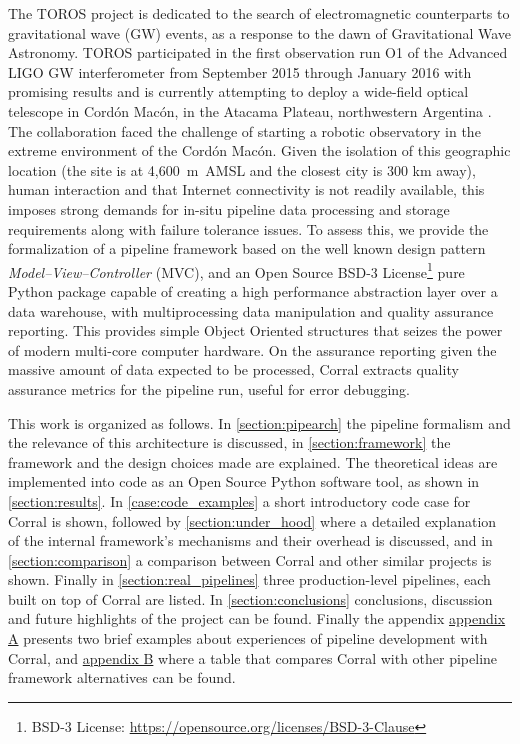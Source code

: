 \documentclass[final,5p,times,twocolumn,authoryear]{elsarticle}
\begin{document}
The TOROS project is
dedicated to the search of electromagnetic counterparts to gravitational wave (GW) events, as a response
to the dawn of Gravitational Wave Astronomy.
%
TOROS participated in the first observation run O1 of the Advanced LIGO GW interferometer \citep{ligo_seminal, O1discoveries}
from September 2015 through January 2016 with promising results \citep{resultsToros_beroiz_2016} and is currently attempting to deploy a wide-field optical telescope in Cord\'on Mac\'on, in the
Atacama Plateau, northwestern Argentina \citep{renzi2009caracterizacion, tremblin2012worldwide}.
%
The collaboration faced the challenge of starting a robotic observatory in
the extreme environment of the Cord\'on Mac\'on.
%
Given the isolation of this geographic location
(the site is at 4,600~m~AMSL and the closest city is 300 km away), human interaction
and that Internet connectivity is not readily available,
this imposes strong demands for in-situ pipeline data processing and storage requirements
along with failure tolerance issues.
%
To assess this, we provide the formalization of a pipeline framework based on the
well known design pattern \textit{Model--View--Controller} (MVC), and
an Open Source BSD-3 License\footnote{BSD-3 License: \url{https://opensource.org/licenses/BSD-3-Clause}}
pure Python package capable of creating a high performance abstraction layer
over a data warehouse, with multiprocessing data manipulation and quality assurance reporting.
%
This provides simple Object Oriented structures that seizes the power of modern multi-core
computer hardware.
%
On the assurance reporting given the massive amount of data expected to be processed,
Corral extracts quality assurance metrics for the pipeline run, useful for error debugging.

This work is organized as follows.
%
In \autoref{section:pipearch} the pipeline formalism and the
relevance of this architecture is discussed, in
\autoref{section:framework} the framework and the design choices
made are explained.
%
The theoretical ideas are implemented into code as an Open Source Python software tool, as shown in
\autoref{section:results}.
%
In \autoref{case:code_examples} a short introductory code case for Corral is shown,
%
followed by \autoref{section:under_hood} where a detailed explanation of the internal
framework's mechanisms and their overhead is discussed, and in \autoref{section:comparison}
a comparison between Corral and other similar projects is shown. Finally in
%
\autoref{section:real_pipelines} three  production-level pipelines,
each built on top of Corral are listed.
%
In \autoref{section:conclusions} conclusions, discussion and future highlights of the project
can be found.
%
Finally the appendix \hyperref[appendixa]{appendix A} presents two brief
examples about experiences of pipeline development with Corral,
and \hyperref[appendixb]{appendix B} where a table that compares Corral with
other pipeline framework alternatives can be found.
%
\end{document}

